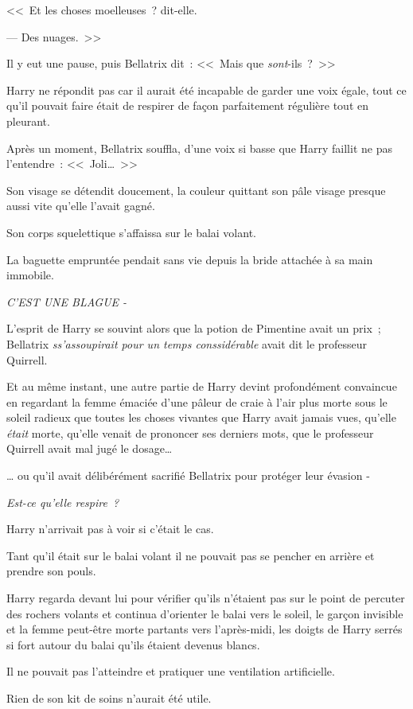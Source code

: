 <<~Et les choses moelleuses~? dit-elle.

--- Des nuages.~>>

Il y eut une pause, puis Bellatrix dit~: <<~Mais que \emph{sont}-ils~?~>>

Harry ne répondit pas car il aurait été incapable de garder une voix égale, tout ce qu'il pouvait faire était de respirer de façon parfaitement régulière tout en pleurant.

Après un moment, Bellatrix souffla, d'une voix si basse que Harry faillit ne pas l'entendre~: <<~Joli…~>>

Son visage se détendit doucement, la couleur quittant son pâle visage presque aussi vite qu'elle l'avait gagné.

Son corps squelettique s'affaissa sur le balai volant.

La baguette empruntée pendait sans vie depuis la bride attachée à sa main immobile.

\emph{C'EST UNE BLAGUE -}

L'esprit de Harry se souvint alors que la potion de Pimentine avait un prix~; Bellatrix \emph{ss'assoupirait pour un temps conssidérable} avait dit le professeur Quirrell.

Et au même instant, une autre partie de Harry devint profondément convaincue en regardant la femme émaciée d'une pâleur de craie à l'air plus morte sous le soleil radieux que toutes les choses vivantes que Harry avait jamais vues, qu'elle \emph{était} morte, qu'elle venait de prononcer ses derniers mots, que le professeur Quirrell avait mal jugé le dosage…

… ou qu'il avait délibérément sacrifié Bellatrix pour protéger leur évasion -

\emph{Est-ce qu'elle respire~?}

Harry n'arrivait pas à voir si c'était le cas.

Tant qu'il était sur le balai volant il ne pouvait pas se pencher en arrière et prendre son pouls.

Harry regarda devant lui pour vérifier qu'ils n'étaient pas sur le point de percuter des rochers volants et continua d'orienter le balai vers le soleil, le garçon invisible et la femme peut-être morte partants vers l'après-midi, les doigts de Harry serrés si fort autour du balai qu'ils étaient devenus blancs.

Il ne pouvait pas l'atteindre et pratiquer une ventilation artificielle.

Rien de son kit de soins n'aurait été utile.

